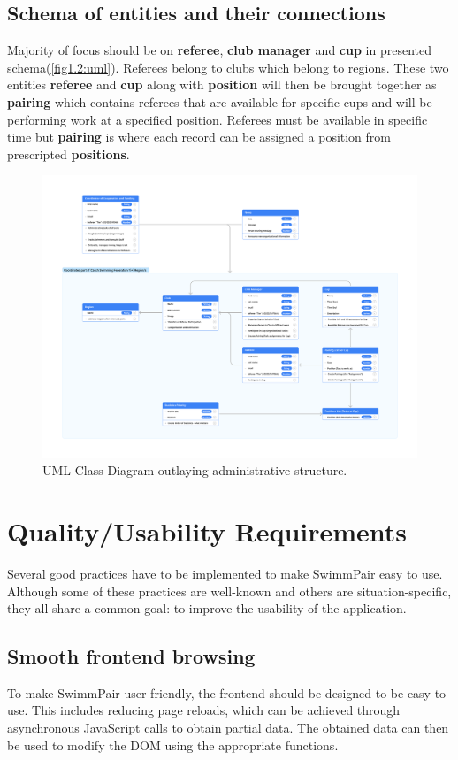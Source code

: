 \subsection*{Schema of entities and their connections}
Majority of focus should be on \textbf{referee}, \textbf{club manager} and \textbf{cup} in presented schema(\autoref{fig1.2:uml}). Referees belong to clubs which belong to regions. These two entities \textbf{referee} and \textbf{cup} along with \textbf{position} will then be brought together as \textbf{pairing} which contains referees that are available for specific cups and will be performing work at a specified position. Referees must be available in specific time but \textbf{pairing} is where each record can be assigned a position from prescripted \textbf{positions}.
\begin{figure}[h]
\includegraphics[scale=0.160]{img/swimmpair_uml.png}
  \caption{UML Class Diagram outlaying administrative structure.}
  \label{fig1.2:uml}
\end{figure}

\section{Quality/Usability Requirements}
Several good practices have to be implemented to make SwimmPair easy to use. Although some of these practices are well-known and others are situation-specific, they all share a common goal: to improve the usability of the application.
\subsection*{Smooth frontend browsing}
To make SwimmPair user-friendly, the frontend should be designed to be easy to use. This includes reducing page reloads, which can be achieved through asynchronous JavaScript calls to obtain partial data. The obtained data can then be used to modify the DOM using the appropriate functions. 
